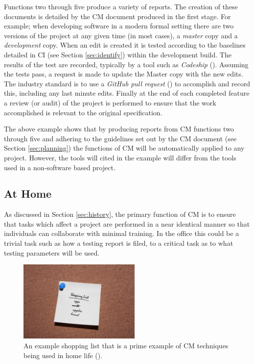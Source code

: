 \documentclass[cmpstyle]{ueacmpstyle}
\begin{document}
		Functions two through five produce a variety of reports. The creation of these documents is detailed by the CM document produced in the first stage. For example; when developing software in a modern formal setting there are two versions of the project at any given time (in most cases), a \emph{master} copy and a \emph{development} copy. When an edit is created it is tested according to the baselines detailed in CI (see Section \ref{sec:identify}) within the development build. The results of the test are recorded, typically by a tool such as \emph{Codeship} (\cite{codeship}). Assuming the tests pass, a request is made to update the Master copy with the new edits. The industry standard is to use a \emph{GitHub pull request} (\cite{github}) to accomplish and record this, including any last minute edits. Finally at the end of each completed feature a review (or audit) of the project is performed to ensure that the work accomplished is relevant to the original specification. 
		
		The above example shows that by producing reports from CM functions two through five and adhering to the guidelines set out by the CM document (see Section \ref{sec:planning}) the functions of CM will be automatically applied to any project. However, the tools will cited in the example will differ from the tools used in a non-software based project. 
		
		\subsection{At Home} \label{sec:home}
		As discussed in Section \ref{sec:history}, the primary function of CM is to ensure that tasks which affect a project are performed in a near identical manner so that individuals can collaborate with minimal training. In the office this could be a trivial task such as how a testing report is filed, to a critical task as to what testing parameters will be used. 
		
		\begin{figure}
			\centering
			\includegraphics[height=4cm]{images/shopping-list.jpg}
			\caption{An example shopping list that is a prime example of CM techniques being used in home life (\cite{shopping-list}).} \label{fig:shopping}
		\end{figure}
	
\end{document}
